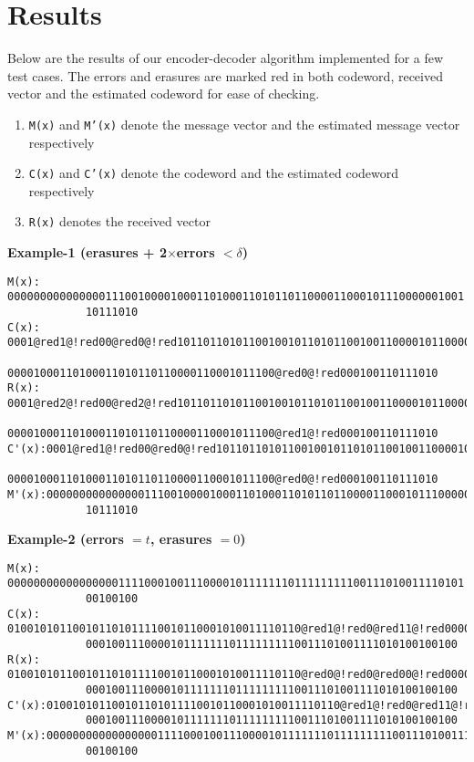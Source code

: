 \documentclass[10 pt]{article}
\begin{document}
\section{Results}
Below are the results of our encoder-decoder algorithm implemented for a few test cases. The errors and erasures are marked red in both codeword, received vector and the estimated codeword for ease of checking.
\renewcommand{\labelenumi}{$\bullet$}
\begin{enumerate}
	\item \texttt{M(x)} and \texttt{M'(x)} denote the message vector and the estimated message vector respectively
    \item \texttt{C(x)} and \texttt{C'(x)} denote the codeword and the estimated codeword respectively
    \item \texttt{R(x)} denotes the received vector
\end{enumerate}
\textbf{Example-1 (erasures + 2$\times$errors $< \delta$)}
\begin{lstlisting}
M(x): 0000000000000001110010000100011010001101011011000011000101110000001001
			10111010
C(x): 0001@red1@!red00@red0@!red1011011010110010010110101100100110000101100000@red0@!red000000000@red1@!red11001
			00001000110100011010110110000110001011100@red0@!red000100110111010
R(x): 0001@red2@!red00@red2@!red1011011010110010010110101100100110000101100000@red2@!red000000000@red0@!red11001
			00001000110100011010110110000110001011100@red1@!red000100110111010
C'(x):0001@red1@!red00@red0@!red1011011010110010010110101100100110000101100000@red0@!red000000000@red1@!red11001
			00001000110100011010110110000110001011100@red0@!red000100110111010
M'(x):0000000000000001110010000100011010001101011011000011000101110000001001
			10111010
\end{lstlisting}
\textbf{Example-2 (errors $= t$, erasures $= 0$)}
\begin{lstlisting}
M(x): 0000000000000000011110001001110000101111111011111111100111010011110101
			00100100
C(x): 010010101100101101011110010110001010011110110@red1@!red0@red11@!red00000000000000000@red1111@!red
			000100111000010111111101111111110011101001111010100100100
R(x): 010010101100101101011110010110001010011110110@red0@!red0@red00@!red00000000000000000@red0000@!red
			000100111000010111111101111111110011101001111010100100100
C'(x):010010101100101101011110010110001010011110110@red1@!red0@red11@!red00000000000000000@red1111@!red
			000100111000010111111101111111110011101001111010100100100
M'(x):0000000000000000011110001001110000101111111011111111100111010011110101
			00100100
\end{lstlisting}
\end{document}
